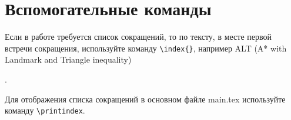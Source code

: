 \section{Вспомогательные команды}

Если в работе требуется список сокращений, то по тексту, в месте первой встречи сокращения, используйте команду \verb|\index{}|, например ALT (A* with Landmark and Triangle inequality)  \begin{spverbatim}\end{spverbatim}. 

Для отображения списка сокращений в основном файле main.tex используйте команду \verb|\printindex|.